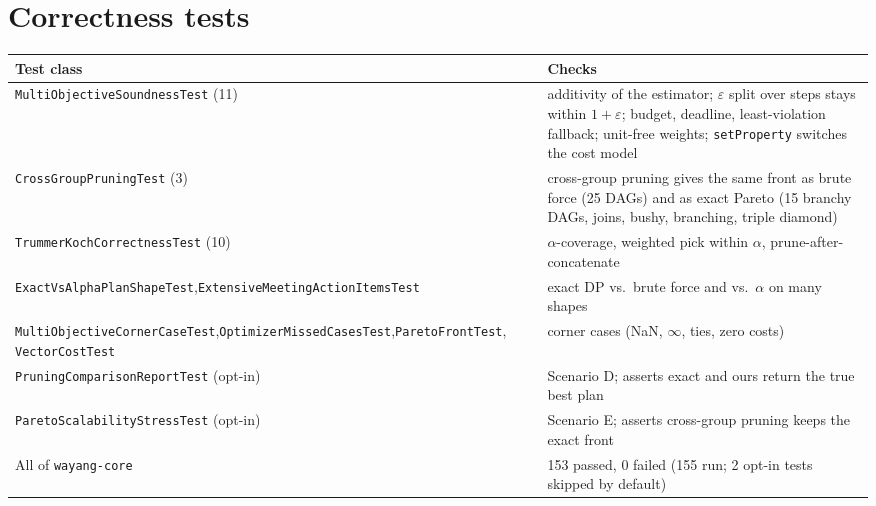 \documentclass[10pt,a4paper]{article}
\begin{document}
\section{Correctness tests}
\begin{center}\small
\begin{tabular}{@{}>{\raggedright\arraybackslash}p{}p{}@{}}
\toprule
Test class & Checks\\
\midrule
\texttt{MultiObjectiveSoundnessTest} (11) & additivity of the estimator; $\varepsilon$ split over steps stays within $1+\varepsilon$;
budget, deadline, least-violation fallback; unit-free weights; \texttt{setProperty} switches the cost model\\
\texttt{CrossGroupPruningTest} (3) & cross-group pruning gives the same front as brute force (25 DAGs) and as exact Pareto
(15 branchy DAGs, joins, bushy, branching, triple diamond)\\
\texttt{TrummerKochCorrectnessTest} (10) & $\alpha$-coverage, weighted pick within $\alpha$, prune-after-concatenate\\
\texttt{ExactVsAlphaPlanShapeTest},\newline \texttt{ExtensiveMeetingActionItemsTest} & exact DP vs.\ brute force and vs.\ $\alpha$ on many shapes\\
\texttt{MultiObjectiveCornerCaseTest},\newline \texttt{OptimizerMissedCasesTest},\newline \texttt{ParetoFrontTest}, \texttt{VectorCostTest} & corner cases (NaN, $\infty$, ties, zero costs)\\
\texttt{PruningComparisonReportTest} (opt-in) & Scenario D; asserts exact and ours return the true best plan\\
\texttt{ParetoScalabilityStressTest} (opt-in) & Scenario E; asserts cross-group pruning keeps the exact front\\
\midrule
All of \texttt{wayang-core} & 153 passed, 0 failed (155 run; 2 opt-in tests skipped by default)\\
\bottomrule
\end{tabular}
\end{center}

\end{document}
